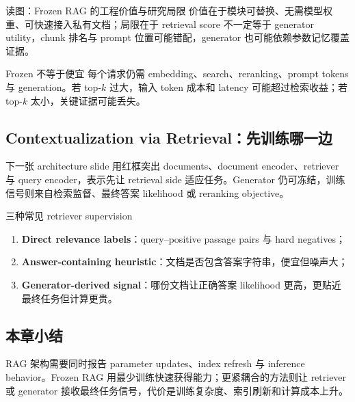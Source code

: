\begin{knowledgebox}{读图：Frozen RAG 的工程价值与研究局限}
价值在于模块可替换、无需模型权重、可快速接入私有文档；局限在于 retrieval score 不一定等于 generator utility，chunk 排名与 prompt 位置可能错配，generator 也可能依赖参数记忆覆盖证据。
\end{knowledgebox}

\begin{warningbox}{Frozen 不等于便宜}
每个请求仍需 embedding、search、reranking、prompt tokens 与 generation。若 top-$k$ 过大，输入 token 成本和 latency 可能超过检索收益；若 top-$k$ 太小，关键证据可能丢失。
\end{warningbox}


\subsection{Contextualization via Retrieval：先训练哪一边}

下一张 architecture slide 用红框突出 documents、document encoder、retriever 与 query encoder，表示先让 retrieval side 适应任务。Generator 仍可冻结，训练信号则来自检索监督、最终答案 likelihood 或 reranking objective。


\begin{knowledgebox}{三种常见 retriever supervision}
\begin{enumerate}
  \item \textbf{Direct relevance labels}：query--positive passage pairs 与 hard negatives；
  \item \textbf{Answer-containing heuristic}：文档是否包含答案字符串，便宜但噪声大；
  \item \textbf{Generator-derived signal}：哪份文档让正确答案 likelihood 更高，更贴近最终任务但计算更贵。
\end{enumerate}
\end{knowledgebox}


\subsection{本章小结}

RAG 架构需要同时报告 parameter updates、index refresh 与 inference behavior。Frozen RAG 用最少训练快速获得能力；更紧耦合的方法则让 retriever 或 generator 接收最终任务信号，代价是训练复杂度、索引刷新和计算成本上升。

